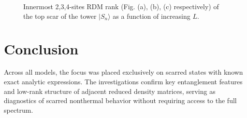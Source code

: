 \documentclass[11pt]{article}
\begin{document}
\begin{itemize}
\begin{figure}[H]
\begin{subfigure}{0.45\textwidth}
        \caption{}
        \label{fig:image3hb}
    \end{subfigure}

    \caption{Innermost 2,3,4-sites RDM  rank (Fig. (a), (b), (c) respectively) of the top scar of the tower $|S_n\rangle$ as a function of increasing $L$.}
    \label{fig:hb_scars_tower}
\end{figure}


\end{itemize}


\vspace{0.5cm}
\pagebreak
\section*{Conclusion}

Across all models, the focus was placed exclusively on scarred states with known exact analytic expressions. The investigations confirm key entanglement features and low-rank structure of adjacent reduced density matrices, serving as diagnostics of scarred nonthermal behavior without requiring access to the full spectrum.
\end{document}
